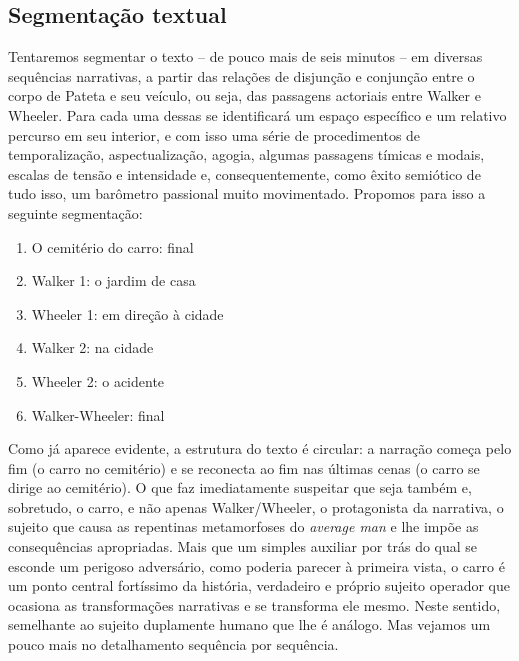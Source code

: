 \begin{multicols}{2}
\section*{Segmentação textual}
\par{}Tentaremos segmentar o texto – de pouco mais de seis minutos – em diversas sequências narrativas,\allowbreak{} a partir das relações de disjunção e conjunção entre o corpo de Pateta e seu veículo,\allowbreak{} ou seja,\allowbreak{} das passagens actoriais entre Walker e Wheeler.\allowbreak{} Para cada uma dessas se identificará um espaço específico e um relativo percurso em seu interior,\allowbreak{} e com isso uma série de procedimentos de temporalização,\allowbreak{} aspectualização,\allowbreak{} agogia,\allowbreak{} algumas passagens tímicas e modais,\allowbreak{} escalas de tensão e intensidade e,\allowbreak{} consequentemente,\allowbreak{} como êxito semiótico de tudo isso,\allowbreak{} um barômetro passional muito movimentado.\allowbreak{} Propomos para isso a seguinte segmentação:\allowbreak{}
\begin{enumerate}[label=\arabic*,leftmargin=*]
\item \par{}O cemitério do carro:\allowbreak{} final
\item \par{}Walker 1:\allowbreak{} o jardim de casa
\item \par{}Wheeler 1:\allowbreak{} em direção à cidade
\item \par{}Walker 2:\allowbreak{} na cidade
\item \par{}Wheeler 2:\allowbreak{} o acidente
\item \par{}Walker-\allowbreak{}Wheeler:\allowbreak{} final
\end{enumerate}


\par{}Como já aparece evidente,\allowbreak{} a estrutura do texto é circular:\allowbreak{} a narração começa pelo fim (\allowbreak{}o carro no cemitério)\allowbreak{} e se reconecta ao fim nas últimas cenas (\allowbreak{}o carro se dirige ao cemitério)\allowbreak{}.\allowbreak{} O que faz imediatamente suspeitar que seja também e,\allowbreak{} sobretudo,\allowbreak{} o carro,\allowbreak{} e não apenas Walker\fshyp{}Wheeler,\allowbreak{} o protagonista da narrativa,\allowbreak{} o sujeito que causa as repentinas metamorfoses do \textit{average man} e lhe impõe as consequências apropriadas.\allowbreak{} Mais que um simples auxiliar por trás do qual se esconde um perigoso adversário,\allowbreak{} como poderia parecer à primeira vista,\allowbreak{} o carro é um ponto central fortíssimo da história,\allowbreak{} verdadeiro e próprio sujeito operador que ocasiona as transformações narrativas e se transforma ele mesmo.\allowbreak{} Neste sentido,\allowbreak{} semelhante ao sujeito duplamente humano que lhe é análogo.\allowbreak{} Mas vejamos um pouco mais no detalhamento sequência por sequência.\allowbreak{}

\end{multicols}
